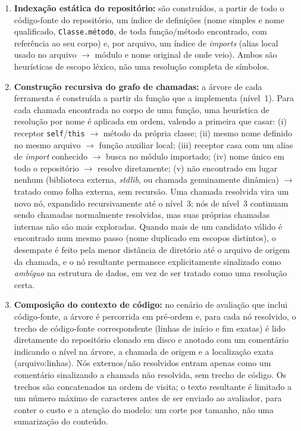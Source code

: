 \begin{enumerate}
    \item \textbf{Indexação estática do repositório:} são construídos, a
    partir de todo o código-fonte do repositório, um índice de definições
    (nome simples e nome qualificado, \texttt{Classe.método}, de toda
    função/método encontrado, com referência ao seu corpo) e, por arquivo,
    um índice de \textit{imports} (alias local usado no arquivo
    $\rightarrow$ módulo e nome original de onde veio). Ambos são
    heurísticas de escopo léxico, não uma resolução completa de símbolos.

    \item \textbf{Construção recursiva do grafo de chamadas:} a árvore de
    cada ferramenta é construída a partir da função que a implementa
    (nível~1). Para cada chamada encontrada no corpo de uma função, uma
    heurística de resolução por nome é aplicada em ordem, valendo a
    primeira que casar: (i) receptor \texttt{self}/\texttt{this}
    $\rightarrow$ método da própria classe; (ii) mesmo nome definido no
    mesmo arquivo $\rightarrow$ função auxiliar local; (iii) receptor casa
    com um alias de \textit{import} conhecido $\rightarrow$ busca no
    módulo importado; (iv) nome único em todo o repositório
    $\rightarrow$ resolve diretamente; (v) não encontrado em lugar nenhum
    (biblioteca externa, \textit{stdlib}, ou chamada genuinamente
    dinâmica) $\rightarrow$ tratado como folha externa, sem recursão.
    Uma chamada resolvida vira um novo nó, expandido recursivamente até o
    nível~3; nós de nível~3 continuam sendo chamadas normalmente
    resolvidas, mas suas próprias chamadas internas não são mais
    exploradas. Quando mais de um candidato válido é encontrado num mesmo
    passo (nome duplicado em escopos distintos), o desempate é feito pela
    menor distância de diretório até o arquivo de origem da chamada, e o
    nó resultante permanece explicitamente sinalizado como \textit{ambíguo}
    na estrutura de dados, em vez de ser tratado como uma resolução certa.

    \item \textbf{Composição do contexto de código:} no cenário de
    avaliação que inclui código-fonte, a árvore é percorrida em
    pré-ordem e, para cada nó resolvido, o trecho de código-fonte
    correspondente (linhas de início e fim exatas) é lido diretamente do
    repositório clonado em disco e anotado com um comentário indicando o
    nível na árvore, a chamada de origem e a localização exata
    (arquivo:linhas). Nós externos/não resolvidos entram apenas como um
    comentário sinalizando a chamada não resolvida, sem trecho de código.
    Os trechos são concatenados na ordem de visita; o texto resultante é
    limitado a um número máximo de caracteres antes de ser enviado ao
    avaliador, para conter o custo e a atenção do modelo: um corte por
    tamanho, não uma sumarização do conteúdo.
\end{enumerate}

